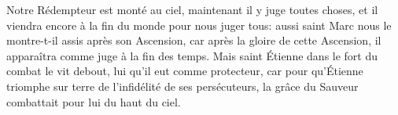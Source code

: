 Notre Rédempteur est monté au ciel, maintenant il y juge toutes choses,
	et il viendra encore à la fin du monde pour nous juger tous:
	aussi saint Marc nous le montre-t-il assis après son Ascension,
	car après la gloire de cette Ascension,
	il apparaîtra comme juge à la fin des temps.
Mais saint Étienne dans le fort du combat le vit debout,
	lui qu’il eut comme protecteur,
	car pour qu’Étienne triomphe sur terre de l’infidélité de ses persécuteurs,
	la grâce du Sauveur combattait pour lui du haut du ciel.
